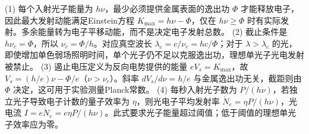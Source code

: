 (1) 每个入射光子能量为 \(h\nu\)，最少必须提供金属表面的逸出功 \(\Phi\) 才能释放电子，因此最大发射动能满足Einstein方程 \(K_{\max}=h\nu-\Phi\)，仅在 \(h\nu\ge\Phi\) 时有实际发射。多余能量转为电子平移动能，而不是决定电子发射总数。
(2) 截止条件是 \(h\nu_c=\Phi\)，所以 \(\nu_c=\Phi/h\)。对应真空波长 \(\lambda_c=c/\nu_c=hc/\Phi\)；对于 \(\lambda>\lambda_c\) 的光，即使增加单色弱场照明时间，单个光子仍不足以克服逸出功，理想单光子光电发射被禁止。
(3) 遏止电压定义为反向电势提供的能量 \(eV_s=K_{\max}\)，故 \(V_s=(h/e)\nu-\Phi/e\)（\(\nu>\nu_c\)）。斜率 \(dV_s/d\nu=h/e\) 与金属逸出功无关，截距则由 \(\Phi\) 决定，这可用于实验测量Planck常数。
(4) 每秒入射光子数为 \(P/(h\nu)\)，若独立光子导致电子计数的量子效率为 \(\eta\)，则光电子平均发射率 \(\dot N_e=\eta P/(h\nu)\)，光电流 \(I=e\dot N_e=e\eta P/(h\nu)\)。此式要求光子能量超过阈值；低于阈值的理想单光子效率应为零。
